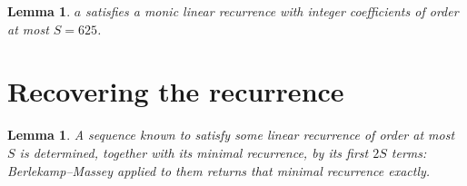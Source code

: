 \documentclass[11pt,a4paper]{article}
\theoremstyle{plain}
\newtheorem{lemma}[theorem]{Lemma}
\theoremstyle{definition}
\begin{document}
\begin{lemma}\label{lem:cf}
$a$ satisfies a monic linear recurrence with integer coefficients of order at most $S=625$.
\end{lemma}

\section{Recovering the recurrence}

\begin{lemma}\label{lem:bm}
A sequence known to satisfy some linear recurrence of order at most $S$ is determined, together
with its minimal recurrence, by its first $2S$ terms: Berlekamp--Massey applied to them returns
that minimal recurrence exactly.
\end{lemma}
\end{document}
